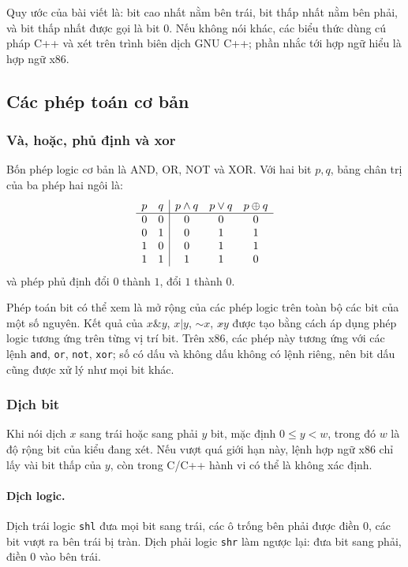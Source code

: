 \documentclass[11pt]{article}
\begin{document}
Quy ước của bài viết là: bit cao nhất nằm bên trái, bit thấp nhất nằm bên phải,
và bit thấp nhất được gọi là bit \(0\). Nếu không nói khác, các biểu thức dùng
cú pháp C++ và xét trên trình biên dịch GNU C++; phần nhắc tới hợp ngữ hiểu là
hợp ngữ x86.

\subsection{Các phép toán cơ bản}

\subsubsection{Và, hoặc, phủ định và xor}

Bốn phép logic cơ bản là AND, OR, NOT và XOR. Với hai bit \(p,q\), bảng chân trị
của ba phép hai ngôi là:
\[
\begin{array}{c c|c c c}
p&q&p\land q&p\lor q&p\oplus q\\
\hline
0&0&0&0&0\\
0&1&0&1&1\\
1&0&0&1&1\\
1&1&1&1&0
\end{array}
\]
và phép phủ định đổi \(0\) thành \(1\), đổi \(1\) thành \(0\).

Phép toán bit có thể xem là mở rộng của các phép logic trên toàn bộ các bit của
một số nguyên. Kết quả của \(x\&y\), \(x|y\), \(\sim x\), \(x\mathbin{\hat{}}y\)
được tạo bằng cách áp dụng phép logic tương ứng trên từng vị trí bit. Trên
x86, các phép này tương ứng với các lệnh \texttt{and}, \texttt{or},
\texttt{not}, \texttt{xor}; số có dấu và không dấu không có lệnh riêng, nên
bit dấu cũng được xử lý như mọi bit khác.

\subsubsection{Dịch bit}

Khi nói dịch \(x\) sang trái hoặc sang phải \(y\) bit, mặc định \(0\le y<w\),
trong đó \(w\) là độ rộng bit của kiểu đang xét. Nếu vượt quá giới hạn này, lệnh
hợp ngữ x86 chỉ lấy vài bit thấp của \(y\), còn trong C/C++ hành vi có thể là
không xác định.

\paragraph{Dịch logic.}
Dịch trái logic \texttt{shl} đưa mọi bit sang trái, các ô trống bên phải được
điền \(0\), các bit vượt ra bên trái bị tràn. Dịch phải logic \texttt{shr} làm
ngược lại: đưa bit sang phải, điền \(0\) vào bên trái.
\end{document}
